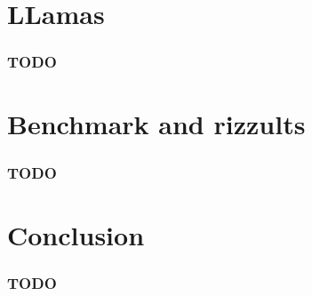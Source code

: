 \documentclass[licencjacka,en]{pracamgr}
\begin{document}
\chapter{LLamas}
\subsection{TODO}

\chapter{Benchmark and rizzults}
\subsection{TODO}

\chapter{Conclusion}
\subsection{TODO}
\end{document}
